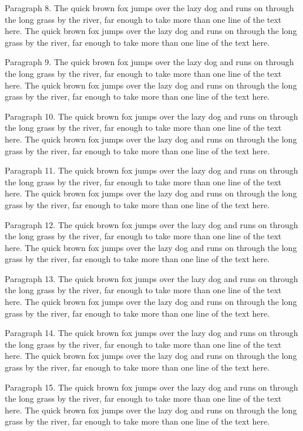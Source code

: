 \documentclass{article}
\begin{document}
Paragraph 8. The quick brown fox jumps over the lazy dog and runs on through the long grass by the river, far enough to take more than one line of the text here. The quick brown fox jumps over the lazy dog and runs on through the long grass by the river, far enough to take more than one line of the text here.

Paragraph 9. The quick brown fox jumps over the lazy dog and runs on through the long grass by the river, far enough to take more than one line of the text here. The quick brown fox jumps over the lazy dog and runs on through the long grass by the river, far enough to take more than one line of the text here.

Paragraph 10. The quick brown fox jumps over the lazy dog and runs on through the long grass by the river, far enough to take more than one line of the text here. The quick brown fox jumps over the lazy dog and runs on through the long grass by the river, far enough to take more than one line of the text here.

Paragraph 11. The quick brown fox jumps over the lazy dog and runs on through the long grass by the river, far enough to take more than one line of the text here. The quick brown fox jumps over the lazy dog and runs on through the long grass by the river, far enough to take more than one line of the text here.

Paragraph 12. The quick brown fox jumps over the lazy dog and runs on through the long grass by the river, far enough to take more than one line of the text here. The quick brown fox jumps over the lazy dog and runs on through the long grass by the river, far enough to take more than one line of the text here.

Paragraph 13. The quick brown fox jumps over the lazy dog and runs on through the long grass by the river, far enough to take more than one line of the text here. The quick brown fox jumps over the lazy dog and runs on through the long grass by the river, far enough to take more than one line of the text here.

Paragraph 14. The quick brown fox jumps over the lazy dog and runs on through the long grass by the river, far enough to take more than one line of the text here. The quick brown fox jumps over the lazy dog and runs on through the long grass by the river, far enough to take more than one line of the text here.

Paragraph 15. The quick brown fox jumps over the lazy dog and runs on through the long grass by the river, far enough to take more than one line of the text here. The quick brown fox jumps over the lazy dog and runs on through the long grass by the river, far enough to take more than one line of the text here.
\end{document}
